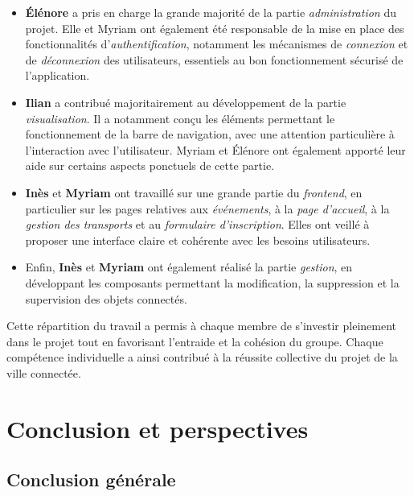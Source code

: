 \documentclass[a4paper,12pt]{report}
\begin{document}
\begin{itemize}
    \item \textbf{Élénore} a pris en charge la grande majorité de la partie \textit{administration} du projet. Elle et Myriam ont également été responsable de la mise en place des fonctionnalités d’\textit{authentification}, notamment les mécanismes de \textit{connexion} et de \textit{déconnexion} des utilisateurs, essentiels au bon fonctionnement sécurisé de l’application.
    
    \item \textbf{Ilian} a contribué majoritairement au développement de la partie \textit{visualisation}. Il a notamment conçu les éléments permettant le fonctionnement de la barre de navigation, avec une attention particulière à l’interaction avec l’utilisateur. Myriam et Élénore ont également apporté leur aide sur certains aspects ponctuels de cette partie.

    \item \textbf{Inès} et \textbf{Myriam} ont travaillé sur une grande partie du \textit{frontend}, en particulier sur les pages relatives aux \textit{événements}, à la \textit{page d'accueil}, à la \textit{gestion des transports} et au \textit{formulaire d’inscription}. Elles ont veillé à proposer une interface claire et cohérente avec les besoins utilisateurs.

    \item Enfin, \textbf{Inès} et \textbf{Myriam} ont également réalisé la partie \textit{gestion}, en développant les composants permettant la modification, la suppression et la supervision des objets connectés.
\end{itemize}

Cette répartition du travail a permis à chaque membre de s’investir pleinement dans le projet tout en favorisant l'entraide et la cohésion du groupe. Chaque compétence individuelle a ainsi contribué à la réussite collective du projet de la ville connectée.

	

	\newpage
	
	\section{Conclusion et perspectives}
	
	\subsection{Conclusion générale}
	
\end{document}
